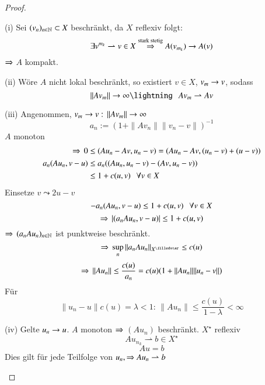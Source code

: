 \begin{proof}
    \begin{description}
    \item{(i)}
        Sei $(v_n)_{n\in \mathbb{N}}\subset X$ beschränkt, da $X$ reflexiv folgt:
        \[
            \exists v^{m_k} \rightharpoonup v \in X\overset{\text{stark stetig}}{\Rightarrow} A(v_{m_k})\rightarrow A(v)
        \]
        $\Rightarrow$ $A$ kompakt.
    \item{(ii)}
    Wöre $A$ nicht lokal beschränkt, so existiert $v\in X$, $v_m\rightarrow v$, sodass
    \[
        \|Av_m\|\ra \infty \lightning  \qq Av_m \rightharpoonup Av
    \]
    \item{(iii)}
    Angenommen, $v_m\rightarrow v: \, \|Av_m\|\rightarrow \infty$
    \[
        a_n:=(1+\|Av_n\|\|v_n-v\|)^{-1}
    \]
    $A$ monoton 
    \begin{align*}
        \Rightarrow \, 0&\leq (Au_n-Av,u_n-v)= (Au_n-Av,(u_n-v)+(u-v))\\
        a_n(Au_n,v-u)&\leq a_n((Au_n,u_n-v)-(Av,u_n-v))\\
        &\leq 1+ c(u,v) \hspace{.25cm} \forall v\in X
    \end{align*}
    Einsetze $v\leadsto 2u-v$
    \[
        -a_n (Au_n,v-u)\leq 1+c(u,v) \hspace{.25cm} \forall v \in X
    \]
    \[
        \Rightarrow \, |(a_n A u_n,v-u)|\leq 1+c(u,v)
    \]
    $\Rightarrow \, (a_nAu_n)_{n\in \mathbb{N}}$ ist punktweise beschränkt.
    \[
        \Ra \, \sup_n\|a_nAu_n\|_{X^\star}\leq c(u)
    \]
    \[
        \Rightarrow \, \|Au_n\|\leq \frac{c(u)}{a_n} = c(u)(1+\|Au_n\|\|u_n-v\|)
    \]
    Für
    \[
        \|u_n-u\|c(u)=\lambda <1: \, \|Au_n\|\leq \frac{c(u)}{1-\lambda}<\infty
    \]
    \item{(iv)}
    Gelte $u_n\rightarrow u$. $A$ monoton $\Rightarrow$ $(Au_n)$ beschränkt.
    $X^\star$ reflexiv
    \[
        Au_{n_k}\rightharpoonup b \in X^\star
    \]
    \[
        Au=b
    \]
    Dies gilt für jede Teilfolge von $u_n, \Rightarrow  Au_n \rightharpoonup b$
    \end{description}
    \[ \]
\end{proof}

